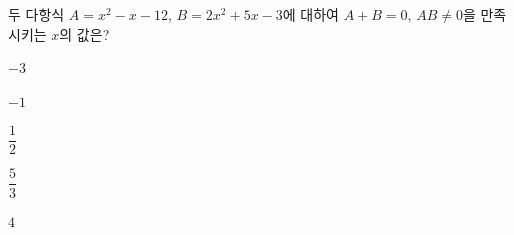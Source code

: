 두 다항식 $A=x^2-x-12$, $B=2x^2+5x-3$에 대하여 $A+B=0$, $AB\ne 0$을 만족시키는 $x$의 값은?
\begin{choices32}{\rule[-3ex]{0pt}{8ex}$-3$}{\rule[-3ex]{0pt}{8ex}$-1$}{\rule[-3ex]{0pt}{8ex}$\dfrac{1}{2}$}{\rule[-3ex]{0pt}{8ex}$\dfrac{5}{3}$}{\rule[-3ex]{0pt}{8ex}$4$}\end{choices32}
